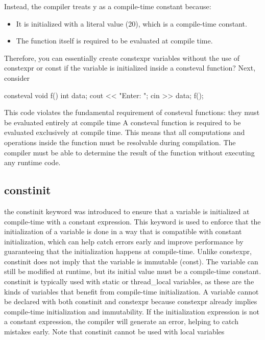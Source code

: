 \documentclass{report}
\begin{document}
\bigbreak \noindent 
Instead, the compiler treats y as a compile-time constant because:
\begin{itemize}
    \item It is initialized with a literal value (20), which is a compile-time constant.
    \item The function itself is required to be evaluated at compile time.
\end{itemize}
\bigbreak \noindent 
Therefore, you can essentially create constexpr variables without the use of constexpr or const if the variable is initialized inside a consteval function?
\bigbreak \noindent 
Next, consider
\bigbreak \noindent 
\begin{cppcode}
    consteval void f() {
        int data;
        cout << "Enter: ";
        cin >>  data;
    }
    f();
\end{cppcode}
\bigbreak \noindent 
This code violates the fundamental requirement of consteval functions: they must be evaluated entirely at compile time
\bigbreak \noindent 
A consteval function is required to be evaluated exclusively at compile time. This means that all computations and operations inside the function must be resolvable during compilation.
\bigbreak \noindent 
The compiler must be able to determine the result of the function without executing any runtime code.

\bigbreak \noindent 
\subsection{constinit}
\bigbreak \noindent 
the constinit keyword was introduced to ensure that a variable is initialized at compile-time with a constant expression. This keyword is used to enforce that the initialization of a variable is done in a way that is compatible with constant initialization, which can help catch errors early and improve performance by guaranteeing that the initialization happens at compile-time.
\bigbreak \noindent 
Unlike constexpr, constinit does not imply that the variable is immutable (const). The variable can still be modified at runtime, but its initial value must be a compile-time constant.
\bigbreak \noindent 
constinit is typically used with static or thread\_local variables, as these are the kinds of variables that benefit from compile-time initialization.
\bigbreak \noindent 
A variable cannot be declared with both constinit and constexpr because constexpr already implies compile-time initialization and immutability.
\bigbreak \noindent 
If the initialization expression is not a constant expression, the compiler will generate an error, helping to catch mistakes early.
\bigbreak \noindent 
Note that constinit cannot be used with local variables
\end{document}
